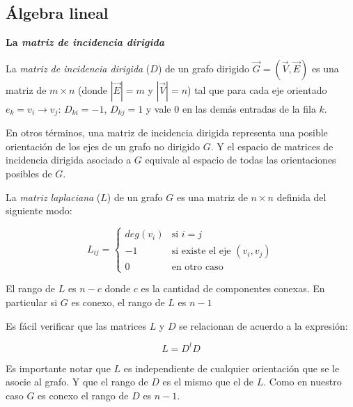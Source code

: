 \documentclass[conference,compsoc,a4paper]{IEEEtran}
\begin{document}
\subsection{Álgebra lineal}

\textbf{La \textit{matriz de incidencia dirigida}}

\smallskip

La \textit{matriz de incidencia dirigida} ($D$) de un grafo dirigido 
$\vec G = (\vec V, \vec E)$ es una matriz de $m \times n$ (donde $|\vec
 E| = m$ y $|\vec V| = n$) tal que para cada eje orientado 
$e_k=v_i \rightarrow v_j$: $D_{ki} = -1$, $D_{kj} = 1$ y vale $0$ en 
las demás entradas de la fila $k$.

\smallskip

En otros términos, una matriz de incidencia dirigida representa una 
posible orientación de los ejes de un grafo no dirigido $G$. Y el 
espacio de matrices de incidencia dirigida asociado a $G$ 
equivale al espacio de todas las orientaciones posibles de $G$.

\bigskip


La \textit{matriz laplaciana} ($L$) de un grafo $G$ es una matriz de 
$n \times n$ definida del siguiente modo:

$$
	L_{ij} =
	\begin{cases}
	deg(v_i) & \text{si $i = j$} \\
	-1 & \text{si existe el eje $(v_i,v_j)$} \\
	0 & \text{en otro caso} 
	\end{cases}
$$

El rango de $L$ es $n-c$ donde $c$ es la cantidad de componentes 
conexas. En particular si $G$ es conexo, el rango de $L$ es $n-1$

\bigskip


Es fácil verificar que las matrices $L$ y $D$ se relacionan de acuerdo
a la expresión:

$$L = D^t D$$

Es importante notar que $L$ es independiente de cualquier orientación 
que se le asocie al grafo. Y que el rango de $D$ es el mismo que el de 
$L$. Como en nuestro caso $G$ es conexo el rango de $D$ es $n-1$.

\bigskip

\end{document}
